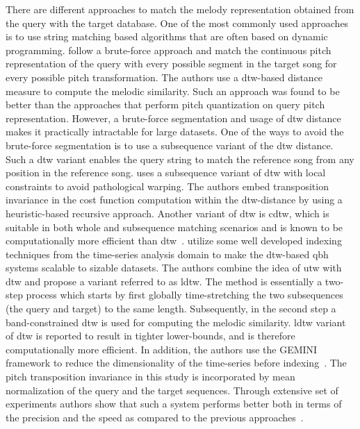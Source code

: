 There are different approaches to match the melody representation obtained from the query with the target database. One of the most commonly used approaches is to use string matching based algorithms that are often based on dynamic programming. \cite{mazzoni2001melody} follow a brute-force approach and match the continuous pitch representation of the query with every possible segment in the target song for every possible pitch transformation. The authors use a \gls{dtw}-based distance measure to compute the melodic similarity. Such an approach was found to be better than the approaches that perform pitch quantization on query pitch representation. However, a brute-force segmentation and usage of \gls{dtw} distance makes it practically intractable for large datasets. One of the ways to avoid the brute-force segmentation is to use a subsequence variant of the \gls{dtw} distance. Such a \gls{dtw} variant enables the query string to match the reference song from any position in the reference song. \cite{jang2000query} uses a subsequence variant of \gls{dtw} with local constraints to avoid pathological warping. The authors embed transposition invariance in the cost function computation within the \gls{dtw}-distance by using a heuristic-based recursive approach. Another variant of \gls{dtw} is \gls{cdtw}, which is suitable in both whole and subsequence matching scenarios and is known to be computationally more efficient than \gls{dtw}~\citep{lijffijt2010benchmarking}. \cite{zhu2003query} utilize some well developed indexing techniques from the time-series analysis domain to make the \gls{dtw}-based \gls{qbh} systems scalable to sizable datasets. The authors combine the idea of \gls{utw} with \gls{dtw} and propose a variant referred to as \gls{ldtw}. The method is essentially a two-step process which starts by first globally time-stretching the two subsequences (the query and target) to the same length. Subsequently, in the second step a band-constrained \gls{dtw} is used for computing the melodic similarity. \gls{ldtw} variant of \gls{dtw} is reported to result in tighter lower-bounds, and is therefore computationally more efficient. In addition, the authors use the GEMINI framework to reduce the dimensionality of the time-series before indexing~\citep{keogh2001dimensionality}. The pitch transposition invariance in this study is incorporated by mean normalization of the query and the target sequences. Through extensive set of experiments authors show that such a system performs better both in terms of the precision and the speed as compared to the previous approaches~\citep{zhu2003query}. 

